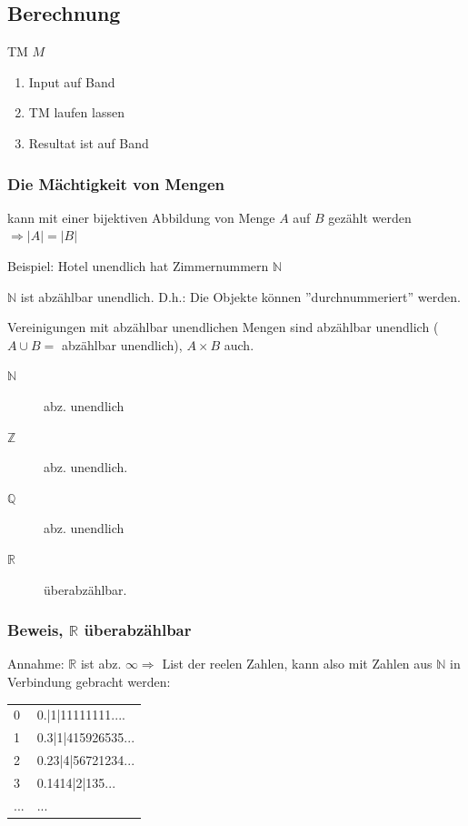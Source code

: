 
\subsection{Berechnung}

TM $M$

\begin{enumerate}
	\item Input auf Band
	\item TM laufen lassen
	\item Resultat ist auf Band
\end{enumerate}

\subsubsection{Die Mächtigkeit von Mengen}

kann mit einer bijektiven Abbildung von Menge $A$ auf $B$ gezählt werden $\Rightarrow |A| =  |B|$

Beispiel: Hotel unendlich hat Zimmernummern $\mathbb{N}$


$\mathbb{N}$ ist abzählbar unendlich. D.h.: Die Objekte können ''durchnummeriert'' werden. 

Vereinigungen mit abzählbar unendlichen Mengen sind abzählbar unendlich ($A \cup B =$ abzählbar unendlich), $A \times B$ auch.

\begin{description}
	\item[$\mathbb{N}$] abz. unendlich
	\item[$\mathbb{Z}$] abz. unendlich.
	
	\item[$\mathbb{Q}$] abz. unendlich
	\item[$\mathbb{R}$] überabzählbar.
\end{description}


\subsubsection{Beweis, $\mathbb{R}$ überabzählbar}

Annahme: $\mathbb{R}$ ist abz. $\infty \Rightarrow$ List der reelen Zahlen, kann also mit Zahlen aus $\mathbb{N}$ in Verbindung gebracht werden:

\begin{tabular}{l l}
	0 & 0.|1|11111111.... \\
	1 & 0.3|1|415926535... \\
	2 & 0.23|4|56721234... \\
	3 & 0.1414|2|135... \\
	... & ...
\end{tabular}

